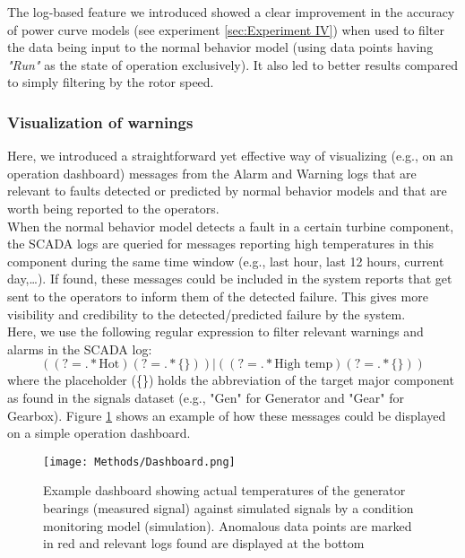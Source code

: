       The log-based feature we introduced showed a clear improvement in the accuracy of power curve models (see experiment \ref{sec:Experiment IV}) when used to filter the data being input 
      to the normal behavior model (using data points having \emph{"Run"} as the state of operation exclusively). It also led to better results compared to 
      simply filtering by the rotor speed.
     

    \subsubsection{Visualization of warnings}
    \label{subsub:vis_warnings}
      Here, we introduced a straightforward yet effective way of visualizing (e.g., on an operation dashboard) messages from the Alarm and Warning logs that are relevant 
      to faults detected or predicted by normal behavior models and that are worth being reported to the operators.\\
      When the normal behavior model detects a fault in a certain turbine component, the SCADA logs are queried for messages reporting high temperatures in this component 
      during the same time window (e.g., last hour, last 12 hours, current day,\dots). If found, these messages could be included in the system reports that get sent to the operators
      to inform them of the detected failure. This gives more visibility and credibility to the detected/predicted failure by the system.\\
      Here, we use the following regular expression to filter relevant warnings and alarms in the SCADA log:
      \begin{equation}
        ((?=.*\text{Hot})(?=.*\{\}))|((?=.*\text{High temp})(?=.*\{\}))
      \end{equation}
      where the placeholder (\{\}) holds the abbreviation of the target major component as found in the signals dataset 
      (e.g., "Gen" for Generator and "Gear" for Gearbox). Figure \ref{fig:dashboard} shows an example of how these messages could be displayed 
      on a simple operation dashboard.

      \begin{figure}[H]
        \begin{center}
          \texttt{[image: Methods/Dashboard.png]}
        \end{center}
        \caption{Example dashboard showing actual temperatures of the generator bearings (measured signal) against simulated signals 
        by a condition monitoring model (simulation). Anomalous data points are marked in red and relevant logs found are displayed at the bottom}
        \label{fig:dashboard}
      \end{figure}
    

